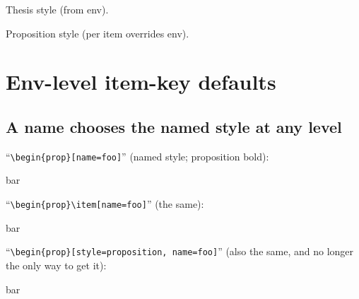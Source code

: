\documentclass{article}
\begin{document}
\begin{prop}[style=thesis]
  \item[Hypothesis C] Thesis style (from env).
  \item[style=proposition, Override] Proposition style (per item overrides env).
\end{prop}

\section{Env-level item-key defaults}


\subsection{A name chooses the named style at any level}


``\verb|\begin{prop}[name=foo]|'' (named style; proposition bold):
\begin{prop}[name=foo]
  \item bar
\end{prop}

``\verb|\begin{prop}\item[name=foo]|'' (the same):
\begin{prop}
  \item[name=foo] bar
\end{prop}

``\verb|\begin{prop}[style=proposition, name=foo]|'' (also the same, and no
longer the only way to get it):
\begin{prop}[style=proposition, name=foo]
  \item bar
\end{prop}
\end{document}

